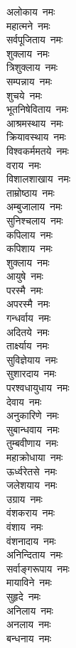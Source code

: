 \begin{multicols}{2}
\begin{flushleft}
अलोकाय~नमः\\
महात्मने~नमः\\
सर्वपूजिताय~नमः\\
शुक्लाय~नमः\\
त्रिशुक्लाय~नमः\\
सम्पन्नाय~नमः\hfill{}\\
शुचये~नमः\\
भूतनिषेविताय~नमः\\
आश्रमस्थाय~नमः\\
क्रियावस्थाय~नमः\\
विश्वकर्ममतये~नमः\\
वराय~नमः\\
विशालशाखाय~नमः\\
ताम्रोष्ठाय~नमः\\
अम्बुजालाय~नमः\\
सुनिश्चलाय~नमः\hfill{}\\
कपिलाय~नमः\\
कपिशाय~नमः\\
शुक्लाय~नमः\\
आयुषे~नमः\\
परस्मै~नमः\\
अपरस्मै~नमः\\
गन्धर्वाय~नमः\\
अदितये~नमः\\
तार्क्ष्याय~नमः\\
सुविज्ञेयाय~नमः\hfill{}\\
सुशारदाय~नमः\\
परश्वधायुधाय~नमः\\
देवाय~नमः\\
अनुकारिणे~नमः\\
सुबान्धवाय~नमः\\
तुम्बवीणाय~नमः\\
महाक्रोधाया~नमः\\
ऊर्ध्वरेतसे~नमः\\
जलेशयाय~नमः\\
उग्राय~नमः\hfill{}\\
वंशकराय~नमः\\
वंशाय~नमः\\
वंशनादाय~नमः\\
अनिन्दिताय~नमः\\
सर्वाङ्गरूपाय~नमः\\
मायाविने~नमः\\
सुहृदे~नमः\\
अनिलाय~नमः\\
अनलाय~नमः\\
बन्धनाय~नमः\hfill{}\\

\end{flushleft}
\end{multicols}
